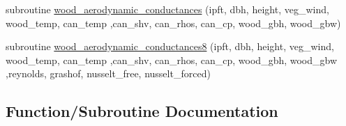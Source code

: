 \begin{DoxyCompactItemize}
\item 
subroutine \hyperlink{namespacecanopy__struct__dynamics_a6cab5b6e950a0bf9da7ef1bee0b5c4ad}{wood\+\_\+aerodynamic\+\_\+conductances} (ipft, dbh, height, veg\+\_\+wind, wood\+\_\+temp, can\+\_\+temp                                                                                                                                                                                   ,can\+\_\+shv, can\+\_\+rhos, can\+\_\+cp, wood\+\_\+gbh, wood\+\_\+gbw)
\item 
subroutine \hyperlink{namespacecanopy__struct__dynamics_ac0b8111bae6ded12c5757262b058d989}{wood\+\_\+aerodynamic\+\_\+conductances8} (ipft, dbh, height, veg\+\_\+wind, wood\+\_\+temp, can\+\_\+temp                                                                                                                                                                                   ,can\+\_\+shv, can\+\_\+rhos, can\+\_\+cp, wood\+\_\+gbh, wood\+\_\+gbw                                                                                                                                                                                           ,reynolds, grashof, nusselt\+\_\+free, nusselt\+\_\+forced)
\end{DoxyCompactItemize}


\subsection{Function/\+Subroutine Documentation}
